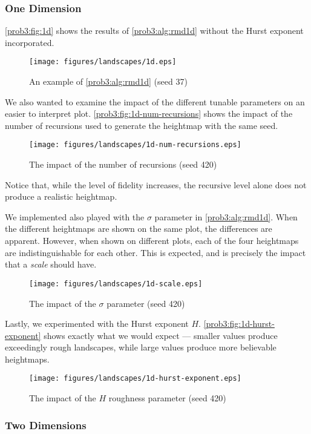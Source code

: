\subsubsection{One Dimension}
\autoref{prob3:fig:1d} shows the results of \autoref{prob3:alg:rmd1d} without the Hurst exponent incorporated.
\begin{figure}[H]
    \centering
    \texttt{[image: figures/landscapes/1d.eps]}
    \caption{An example of \autoref{prob3:alg:rmd1d} (seed 37)}\label{prob3:fig:1d}
\end{figure}

We also wanted to examine the impact of the different tunable parameters on an easier to interpret plot.
\autoref{prob3:fig:1d-num-recursions} shows the impact of the number of recursions used to generate the heightmap with the same seed.
\begin{figure}[H]
    \centering
    \texttt{[image: figures/landscapes/1d-num-recursions.eps]}
    \caption{The impact of the number of recursions (seed 420)}\label{prob3:fig:1d-num-recursions}
\end{figure}
Notice that, while the level of fidelity increases, the recursive level alone does not produce a realistic heightmap.

We implemented also played with the $\sigma$ parameter in \autoref{prob3:alg:rmd1d}. When the different heightmaps are shown on the same plot, the differences are apparent.
However, when shown on different plots, each of the four heightmaps are indistinguishable for each other.
This is expected, and is precisely the impact that a \textit{scale} should have.

\begin{figure}[H]
    \centering
    \texttt{[image: figures/landscapes/1d-scale.eps]}
    \caption{The impact of the $\sigma$ parameter (seed 420)}\label{prob3:fig:1d-scale}
\end{figure}

Lastly, we experimented with the Hurst exponent $H$.
\autoref{prob3:fig:1d-hurst-exponent} shows exactly what we would expect --- smaller values produce exceedingly rough landscapes, while large values produce more believable heightmaps.

\begin{figure}[H]
    \centering
    \texttt{[image: figures/landscapes/1d-hurst-exponent.eps]}
    \caption{The impact of the $H$ roughness parameter (seed 420)}\label{prob3:fig:1d-hurst-exponent}
\end{figure}

\subsubsection{Two Dimensions}
